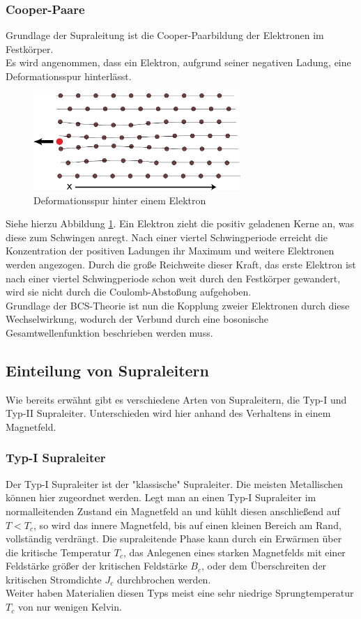         \subsubsection{Cooper-Paare}
Grundlage der Supraleitung ist die Cooper-Paarbildung der Elektronen im Festkörper.
\vspace{3pt}\\
Es wird angenommen, dass ein Elektron, aufgrund seiner negativen Ladung, eine 
Deformationsspur hinterlässt. 
\begin{figure}[h]
    \centering
    \includegraphics[width=0.7\textwidth]{Abb/deformation.pdf}
    \caption{Deformationsspur hinter einem Elektron}
    \label{Abb:def}
\end{figure}
Siehe hierzu Abbildung \ref{Abb:def}. Ein Elektron zieht die positiv geladenen Kerne
an, was diese zum Schwingen anregt. Nach einer viertel Schwingperiode erreicht die
Konzentration der positiven Ladungen ihr Maximum und weitere Elektronen werden 
angezogen. Durch die große Reichweite dieser Kraft, das erste Elektron ist nach
einer viertel Schwingperiode schon weit durch den Festkörper gewandert, wird sie
nicht durch die Coulomb-Abstoßung aufgehoben.
\vspace{3pt}\\
Grundlage der BCS-Theorie ist nun die Kopplung zweier Elektronen durch diese 
Wechselwirkung, wodurch der Verbund durch eine bosonische Gesamtwellenfunktion
beschrieben werden muss.

    \subsection{Einteilung von Supraleitern}
Wie bereits erwähnt gibt es verschiedene Arten von Supraleitern, die Typ-I und
Typ-II Supraleiter. Unterschieden wird hier anhand des Verhaltens in einem 
Magnetfeld. 

        \subsubsection{Typ-I Supraleiter}
Der Typ-I Supraleiter ist der "klassische" Supraleiter. Die meisten Metallischen
können hier zugeordnet werden. Legt man an einen Typ-I Supraleiter im 
normalleitenden Zustand ein Magnetfeld an und kühlt diesen anschließend auf
$T<T_c$, so wird das innere Magnetfeld, bis auf einen kleinen Bereich am Rand,
vollständig verdrängt. Die supraleitende Phase kann durch ein Erwärmen über die
kritische Temperatur $T_c$, das Anlegenen eines starken Magnetfelds mit einer 
Feldstärke größer der kritischen Feldstärke $B_c$, oder dem Überschreiten
der kritischen Stromdichte $J_c$ durchbrochen werden.\\
Weiter haben Materialien diesen Typs meist eine sehr niedrige Sprungtemperatur 
$T_c$ von nur wenigen Kelvin.

